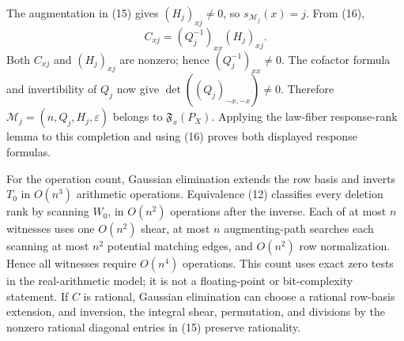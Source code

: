 The augmentation in (15) gives \((H_j)_{xj}\ne0\), so \(s_{\mathcal M_j}(x)=j\). From (16),
\[
 C_{xj}=(Q_j^{-1})_{xx}(H_j)_{xj}.
\]
Both \(C_{xj}\) and \((H_j)_{xj}\) are nonzero; hence \((Q_j^{-1})_{xx}\ne0\). The cofactor formula and invertibility of \(Q_j\) now give \(\det((Q_j)_{-x,-x})\ne0\). Therefore \(\mathcal M_j=(n,Q_j,H_j,\varepsilon)\) belongs to \(\mathfrak F_x(P_X)\). Applying the law-fiber response-rank lemma to this completion and using (16) proves both displayed response formulas.

For the operation count, Gaussian elimination extends the row basis and inverts \(T_0\) in \(O(n^3)\) arithmetic operations. Equivalence (12) classifies every deletion rank by scanning \(W_0\), in \(O(n^2)\) operations after the inverse. Each of at most \(n\) witnesses uses one \(O(n^2)\) shear, at most \(n\) augmenting-path searches each scanning at most \(n^2\) potential matching edges, and \(O(n^2)\) row normalization. Hence all witnesses require \(O(n^4)\) operations. This count uses exact zero tests in the real-arithmetic model; it is not a floating-point or bit-complexity statement. If \(C\) is rational, Gaussian elimination can choose a rational row-basis extension, and inversion, the integral shear, permutation, and divisions by the nonzero rational diagonal entries in (15) preserve rationality.